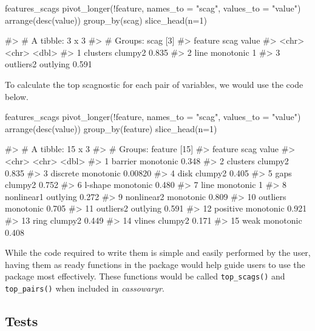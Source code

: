 \begin{Schunk}
\begin{Sinput}
features_scags %
  pivot_longer(!feature, names_to = "scag", values_to = "value") %
  arrange(desc(value)) %
  group_by(scag) %
  slice_head(n=1)
\end{Sinput}
\begin{Soutput}
#> # A tibble: 3 x 3
#> # Groups:   scag [3]
#>   feature   scag      value
#>   <chr>     <chr>     <dbl>
#> 1 clusters  clumpy2   0.835
#> 2 line      monotonic 1    
#> 3 outliers2 outlying  0.591
\end{Soutput}
\end{Schunk}

To calculate the top scagnostic for each pair of variables, we would use
the code below.

\begin{Schunk}
\begin{Sinput}
features_scags %
  pivot_longer(!feature, names_to = "scag", values_to = "value") %
  arrange(desc(value)) %
  group_by(feature) %
  slice_head(n=1)
\end{Sinput}
\begin{Soutput}
#> # A tibble: 15 x 3
#> # Groups:   feature [15]
#>    feature    scag        value
#>    <chr>      <chr>       <dbl>
#>  1 barrier    monotonic 0.348  
#>  2 clusters   clumpy2   0.835  
#>  3 discrete   monotonic 0.00820
#>  4 disk       clumpy2   0.405  
#>  5 gaps       clumpy2   0.752  
#>  6 l-shape    monotonic 0.480  
#>  7 line       monotonic 1      
#>  8 nonlinear1 outlying  0.272  
#>  9 nonlinear2 monotonic 0.809  
#> 10 outliers   monotonic 0.705  
#> 11 outliers2  outlying  0.591  
#> 12 positive   monotonic 0.921  
#> 13 ring       clumpy2   0.449  
#> 14 vlines     clumpy2   0.171  
#> 15 weak       monotonic 0.408
\end{Soutput}
\end{Schunk}

While the code required to write them is simple and easily performed by
the user, having them as ready functions in the package would help guide
users to use the package most effectively. These functions would be
called \texttt{top\_scags()} and \texttt{top\_pairs()} when included in
\emph{cassowaryr}.

\hypertarget{tests}{%
\subsection{Tests}\label{tests}}

